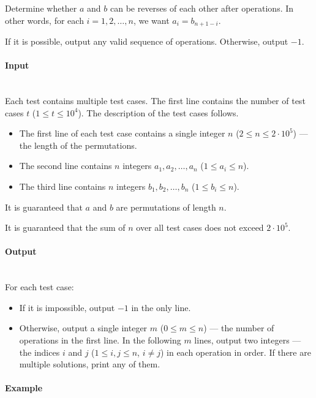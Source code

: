 \documentclass{article}
\begin{document}
Determine whether $a$ and $b$ can be reverses of each other after operations. In other words, for each $i = 1, 2, \ldots, n$, we want $a_i = b_{n+1-i}$.

If it is possible, output any valid sequence of operations. Otherwise, output $-1$.

\paragraph{Input} \mbox{} \\

Each test contains multiple test cases. The first line contains the number of test cases $t$ ($1 \le t \le 10^4$). The description of the test cases follows.

\begin{itemize}
    \item The first line of each test case contains a single integer $n$ ($2 \le n \le 2 \cdot 10^5$) — the length of the permutations.
    \item The second line contains $n$ integers $a_1, a_2, \ldots, a_n$ ($1 \le a_i \le n$).
    \item The third line contains $n$ integers $b_1, b_2, \ldots, b_n$ ($1 \le b_i \le n$).
\end{itemize}

It is guaranteed that $a$ and $b$ are permutations of length $n$.

It is guaranteed that the sum of $n$ over all test cases does not exceed $2 \cdot 10^5$.

\paragraph{Output}\mbox{} \\

For each test case:

\begin{itemize}
    \item If it is impossible, output $-1$ in the only line.
    \item Otherwise, output a single integer $m$ ($0 \le m \le n$) — the number of operations in the first line. In the following $m$ lines, output two integers — the indices $i$ and $j$ ($1 \le i, j \le n$, $i \ne j$) in each operation in order. If there are multiple solutions, print any of them.
\end{itemize}

\paragraph{Example}\mbox{} \\
\end{document}
